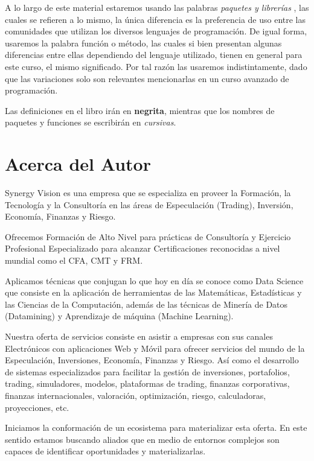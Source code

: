 \documentclass[12pt,]{krantz}
\begin{document}
A lo largo de este material estaremos usando las palabras \emph{paquetes y librerías}
, las cuales se refieren a lo mismo, la única diferencia es la preferencia de uso entre las comunidades que utilizan los diversos lenguajes de programación. De igual forma, usaremos la palabra función o método, las cuales si bien presentan algunas diferencias entre ellas dependiendo del lenguaje utilizado, tienen en general para este curso, el mismo significado. Por tal razón las usaremos indistintamente, dado que las variaciones solo son relevantes mencionarlas en un curso avanzado de programación.

Las definiciones en el libro irán en \textbf{negrita}, mientras que los nombres de paquetes y funciones se escribirán en \emph{cursivas}.

\hypertarget{acerca-del-autor}{%
\section*{Acerca del Autor}\label{acerca-del-autor}}


Synergy Vision es una empresa que se especializa en proveer la Formación, la Tecnología y la Consultoría en las áreas de Especulación (Trading), Inversión, Economía, Finanzas y Riesgo.

Ofrecemos Formación de Alto Nivel para prácticas de Consultoría y Ejercicio Profesional Especializado para alcanzar Certificaciones reconocidas a nivel mundial como el CFA, CMT y FRM.

Aplicamos técnicas que conjugan lo que hoy en día se conoce como Data Science que consiste en la aplicación de herramientas de las Matemáticas, Estadísticas y las Ciencias de la Computación, además de las técnicas de Minería de Datos (Datamining) y Aprendizaje de máquina (Machine Learning).

Nuestra oferta de servicios consiste en asistir a empresas con sus canales Electrónicos con aplicaciones Web y Móvil para ofrecer servicios del mundo de la Especulación, Inversiones, Economía, Finanzas y Riesgo. Así como el desarrollo de sistemas especializados para facilitar la gestión de inversiones, portafolios, trading, simuladores, modelos, plataformas de trading, finanzas corporativas, finanzas internacionales, valoración, optimización, riesgo, calculadoras, proyecciones, etc.

Iniciamos la conformación de un ecosistema para materializar esta oferta. En este sentido estamos buscando aliados que en medio de entornos complejos son capaces de identificar oportunidades y materializarlas.
\end{document}
